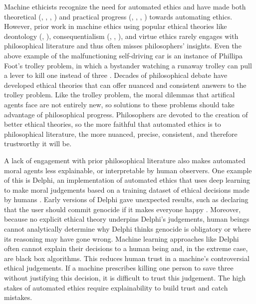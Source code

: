 \begin{isabellebody}
\begin{isamarkuptext}
Machine ethicists recognize the need for automated ethics and have made both theoretical 
(\citep{moralmachineonline}, \citep{davenport}, \citep{moralmachine}, \citep{gabriel}) and practical progress 
(\citep{logicprogramming}, \citep{biology}, \citep{delphi}, \citep{winfield}) towards automating ethics. 
However, prior work in machine ethics using popular ethical theories like deontology (\citep{deon2}, \citep{deon1}), 
consequentialism (\citep{util1}, \citep{util2}, \citep{cloos}), and virtue ethics \citep{berberich} rarely 
engages with philosophical literature and thus often misses philosophers' insights. Even the above example of 
the malfunctioning self-driving car is an instance of Phillipa Foot's trolley problem, 
in which a bystander watching a runaway trolley can pull a lever to kill one instead of three \citep{foot}. 
Decades of philosophical debate have developed ethical theories that can offer nuanced and 
consistent answers to the trolley problem. Like the trolley problem, the moral dilemmas 
that artifical agents face are not entirely new, so solutions to these problems should take advantage of philosophical 
progress. Philosophers are devoted to the creation of better ethical theories, so the 
more faithful that automated ethics is to philosophical literature, the more nuanced, precise, consistent, and
therefore trustworthy it will be.

A lack of engagement with prior philosophical literature also makes automated moral agents less 
explainable, or interpretable by human observers. One example of this is Delphi, an implementation of automated ethics that uses deep 
learning to make moral judgements based on a training dataset of ethical decisions made by humans \citep{delphi}. 
Early versions of Delphi gave unexpected results, such as declaring that the user should commit 
genocide if it makes everyone happy \citep{verge}. Moreover, because no explicit ethical theory underpins 
Delphi's judgements, human beings cannot analytically determine why Delphi thinks genocide is obligatory
or where its reasoning may have gone wrong. 
Machine learning approaches like Delphi often cannot explain their decisions to a human being and, 
in the extreme case, are black box algorithms. This reduces human trust in a machine's controversial 
ethical judgements. If a machine prescribes killing one person to save three without justifying this 
decision, it is difficult to trust this judgement. 
The high stakes of automated ethics require explainability to build trust and catch mistakes. 


\end{isamarkuptext}
\end{isabellebody}
